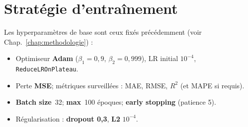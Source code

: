 
\section{Stratégie d’entraînement}
\label{sec:entrainement}

Les hyperparamètres de base sont ceux fixés précédemment (voir Chap.~\ref{chap:methodologie}) :
\begin{itemize}
    \item Optimiseur \textbf{Adam} (\(\beta_1=0{,}9\), \(\beta_2=0{,}999\)), LR initial \(10^{-4}\), \texttt{ReduceLROnPlateau}.
    \item Perte \textbf{MSE}; métriques surveillées : MAE, RMSE, \(R^2\) (et MAPE si requis).
    \item \textbf{Batch size}~32; \textbf{max}~100 époques; \textbf{early stopping} (patience 5).
    \item Régularisation : \textbf{dropout 0{,}3}, \textbf{L2} \(10^{-4}\).
\end{itemize}



